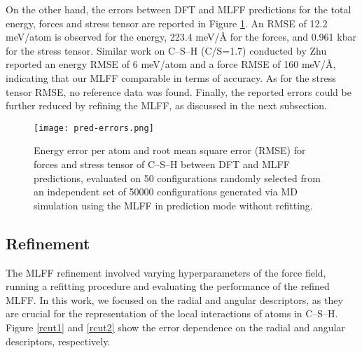 On the other hand, the errors between DFT and MLFF predictions for the total energy, forces and stress tensor are reported in Figure \ref{pred-errors}. An RMSE of 12.2 meV/atom is observed for the energy, 223.4 meV/Å for the forces, and 0.961 kbar for the stress tensor. Similar work on C--S--H (C/S=1.7) conducted by Zhu  \cite{Zhu2024} reported an energy RMSE of 6 meV/atom and a force RMSE of 160 meV/Å, indicating that our MLFF comparable in terms of accuracy. As for the stress tensor RMSE, no reference data was found. Finally, the reported errors could be further reduced by refining the MLFF, as discussed in the next subsection.

\begin{figure}[h]
    \centering
    \texttt{[image: pred-errors.png]}
    \caption{
    Energy error per atom and root mean square error (RMSE) for forces and stress tensor of C--S--H between DFT and MLFF predictions, evaluated on 50 configurations randomly selected from an independent set of 50000 configurations generated via MD simulation using the MLFF in prediction mode without refitting. 
    }
    \label{pred-errors}
\end{figure}

\subsection{Refinement}
The MLFF refinement involved varying hyperparameters of the force field, running a refitting procedure and evaluating the performance of the refined MLFF. In this work, we focused on the radial and angular descriptors, as they are crucial for the representation of the local interactions of atoms in C--S--H. Figure \ref{rcut1} and \ref{rcut2} show the error dependence on the radial and angular descriptors, respectively. 

